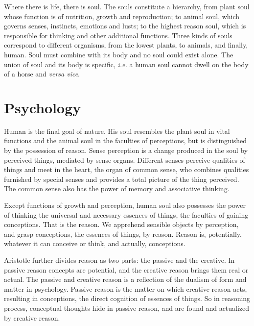 \documentclass[11pt]{article}
\begin{document}
\newline

Where there is life, there is soul. 
The souls constitute a hierarchy, from plant soul whose function is of nutrition, growth and reproduction; 
to animal soul, which governs senses, instincts, emotions and lusts; 
to the highest reason soul, which is responsible for thinking and other additional functions. 
Three kinds of souls correspond to different organisms, from the lowest plants, to animals, and finally, human. 
Soul must combine with its body and no soul could exist alone. 
The union of soul and its body is specific, \textit{i.e.} a human soul cannot dwell on the body of a horse and \textit{versa vice}.

\section{Psychology}
Human is the final goal of nature. 
His soul resembles the plant soul in vital functions and the animal soul in the faculties of perceptions, but is distinguished by the possession of reason. 
Sense perception is a change produced in the soul by perceived things, mediated by sense organs. 
Different senses perceive qualities of things and meet in the heart, the organ of common sense, who combines qualities furnished by special senses and provides a total picture of the thing perceived. 
The common sense also has the power of memory and associative thinking.

\newline

Except functions of growth and perception, human soul also possesses the power of thinking the universal and necessary essences of things, the faculties of gaining conceptions. 
That is the reason. 
We apprehend sensible objects by perception, and grasp conceptions, the essences of things, by reason. 
Reason is, potentially, whatever it can conceive or think, and actually, conceptions.

\newline

Aristotle further divides reason as two parts: 
the passive and the creative. 
In passive reason concepts are potential, and the creative reason brings them real or actual. 
The passive and creative reason is a reflection of the dualism of form and matter in psychology. 
Passive reason is the matter on which creative reason acts, resulting in conceptions, the direct cognition of essences of things. 
So in reasoning process, conceptual thoughts hide in passive reason, and are found and actualized by creative reason.
\end{document}
